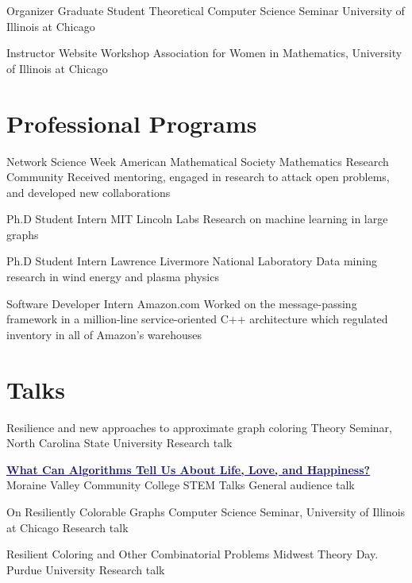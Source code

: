 \documentclass[11pt]{moderncv}
\begin{document}
         {Organizer}
      {Graduate Student Theoretical Computer Science Seminar}
      {University of Illinois at Chicago}
      {}
{}

         {Instructor}
      {Website Workshop}
      {Association for Women in Mathematics, University of Illinois at Chicago}
      {}
{}


   \section{Professional Programs}
         {Network Science Week}
      {American Mathematical Society Mathematics Research Community}
      {}
      {}
      {Received mentoring, engaged in research to attack open problems, and developed new collaborations}

         {Ph.D Student Intern}
      {MIT Lincoln Labs}
      {}
      {}
      {Research on machine learning in large graphs}

         {Ph.D Student Intern}
      {Lawrence Livermore National Laboratory}
      {}
      {}
      {Data mining research in wind energy and plasma physics}

         {Software Developer Intern}
      {Amazon.com}
      {}
      {}
      {Worked on the message-passing framework in a million-line service-oriented C++ architecture which regulated inventory in all of Amazon's warehouses}


   \section{Talks}
         {Resilience and new approaches to approximate graph coloring}
      {Theory Seminar, North Carolina State University}
      {Research talk}
      {}
{}

         {\href{https://www.youtube.com/watch?v=JH4DOjYX59Y}{\textcolor{MidnightBlue}{\underline{\textbf{What Can Algorithms Tell Us About Life, Love, and Happiness?}}}}}
      {Moraine Valley Community College STEM Talks}
      {General audience talk}
      {}
{}

         {On Resiliently Colorable Graphs}
      {Computer Science Seminar, University of Illinois at Chicago}
      {Research talk}
      {}
{}

         {Resilient Coloring and Other Combinatorial Problems}
      {Midwest Theory Day. Purdue University}
      {Research talk}
      {}
{}
\end{document}
